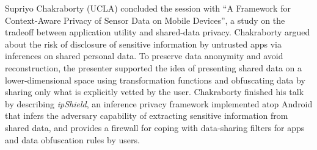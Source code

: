 Supriyo Chakraborty (UCLA) concluded the session with ``A
Framework for Context-Aware Privacy of Sensor Data on Mobile Devices'',
a study on the tradeoff between application utility and shared-data
privacy. Chakraborty argued about the risk of disclosure of sensitive
information by untrusted apps via inferences on shared personal
data. To preserve data anonymity and avoid reconstruction, the presenter
supported the idea of presenting shared data on a lower-dimensional
space using transformation functions and obfuscating data by sharing only
what is explicitly vetted by the user. Chakraborty finished his talk
by describing \emph{ipShield}, an inference privacy framework
implemented atop Android that infers the adversary capability of
extracting sensitive information from shared data, and provides a
firewall for coping with data-sharing filters for apps and data
obfuscation rules by users.

